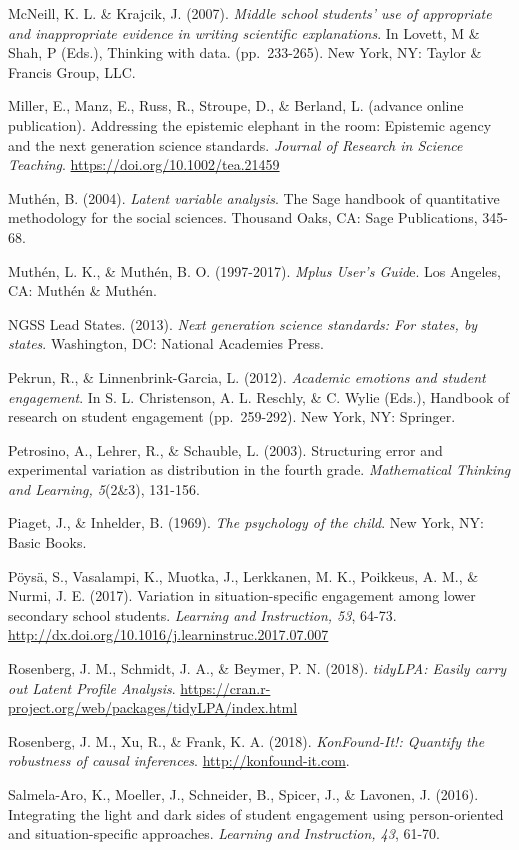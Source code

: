 \documentclass[]{book}
\theoremstyle{definition}
\theoremstyle{definition}
\theoremstyle{definition}
\theoremstyle{remark}
\begin{document}
McNeill, K. L. \& Krajcik, J. (2007). \emph{Middle school students' use
of appropriate and inappropriate evidence in writing scientific
explanations}. In Lovett, M \& Shah, P (Eds.), Thinking with data.
(pp.~233-265). New York, NY: Taylor \& Francis Group, LLC.

Miller, E., Manz, E., Russ, R., Stroupe, D., \& Berland, L. (advance
online publication). Addressing the epistemic elephant in the room:
Epistemic agency and the next generation science standards.
\emph{Journal of Research in Science Teaching}.
\url{https://doi.org/10.1002/tea.21459}

Muthén, B. (2004). \emph{Latent variable analysis}. The Sage handbook of
quantitative methodology for the social sciences. Thousand Oaks, CA:
Sage Publications, 345-68.

Muthén, L. K., \& Muthén, B. O. (1997-2017). \emph{Mplus User's Guid}e.
Los Angeles, CA: Muthén \& Muthén.

NGSS Lead States. (2013). \emph{Next generation science standards: For
states, by states}. Washington, DC: National Academies Press.

Pekrun, R., \& Linnenbrink-Garcia, L. (2012). \emph{Academic emotions
and student engagement}. In S. L. Christenson, A. L. Reschly, \& C.
Wylie (Eds.), Handbook of research on student engagement (pp.~259-292).
New York, NY: Springer.

Petrosino, A., Lehrer, R., \& Schauble, L. (2003). Structuring error and
experimental variation as distribution in the fourth grade.
\emph{Mathematical Thinking and Learning, 5}(2\&3), 131-156.

Piaget, J., \& Inhelder, B. (1969). \emph{The psychology of the child}.
New York, NY: Basic Books.

Pöysä, S., Vasalampi, K., Muotka, J., Lerkkanen, M. K., Poikkeus, A. M.,
\& Nurmi, J. E. (2017). Variation in situation-specific engagement among
lower secondary school students. \emph{Learning and Instruction, 53},
64-73. \url{http://dx.doi.org/10.1016/j.learninstruc.2017.07.007}

Rosenberg, J. M., Schmidt, J. A., \& Beymer, P. N. (2018).
\emph{tidyLPA: Easily carry out Latent Profile Analysis}.
\url{https://cran.r-project.org/web/packages/tidyLPA/index.html}

Rosenberg, J. M., Xu, R., \& Frank, K. A. (2018). \emph{KonFound-It!:
Quantify the robustness of causal inferences}.
\url{http://konfound-it.com}.

Salmela-Aro, K., Moeller, J., Schneider, B., Spicer, J., \& Lavonen, J.
(2016). Integrating the light and dark sides of student engagement using
person-oriented and situation-specific approaches. \emph{Learning and
Instruction, 43}, 61-70.
\end{document}
